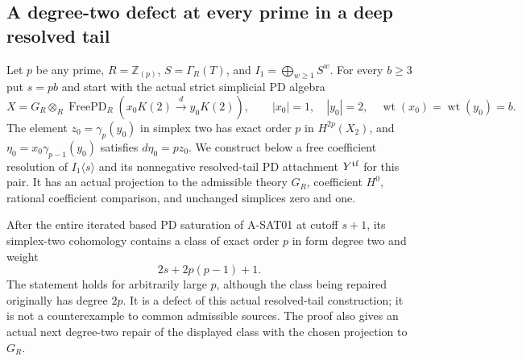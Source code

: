 \subsection{A degree-two defect at every prime in a deep resolved tail}

\begin{theorem}
\label{AP01}
Let $p$ be any prime, $R=\mathbb Z_{(p)}$, $S=\Gamma_R(T)$,
and $I_1=\bigoplus_{w\geq1}S^w$.
For every $b\geq3$ put $s=pb$ and start with the actual
strict simplicial PD algebra
\[
 X=G_R\otimes_R\operatorname{FreePD}_R
          (x_0K(2)\xrightarrow{d}y_0K(2)),
 \qquad |x_0|=1,\quad |y_0|=2,\quad
 \operatorname{wt}(x_0)=\operatorname{wt}(y_0)=b.
 \tag{DP.1}
\]
The element $z_0=\gamma_p(y_0)$ in simplex two has exact
order $p$ in $H^{2p}(X_2)$, and
$\eta_0=x_0\gamma_{p-1}(y_0)$ satisfies $d\eta_0=pz_0$.
We construct below a free coefficient resolution of
$I_1\langle s\rangle$ and its nonnegative resolved-tail
PD attachment $Y^{\rm tf}$ for this pair.
It has an actual projection to the admissible theory $G_R$,
coefficient $H^0$, rational coefficient comparison,
and unchanged simplices zero and one.

After the entire iterated based PD saturation of A-SAT01
at cutoff $s+1$, its simplex-two cohomology contains a
class of exact order $p$ in form degree two and weight
\[
                        2s+2p(p-1)+1.               \tag{DP.2}
\]
The statement holds for arbitrarily large $p$, although
the class being repaired originally has degree $2p$.
It is a defect of this actual resolved-tail construction;
it is not a counterexample to common admissible sources.
The proof also gives an actual next degree-two repair of
the displayed class with the chosen projection to $G_R$.
\end{theorem}

